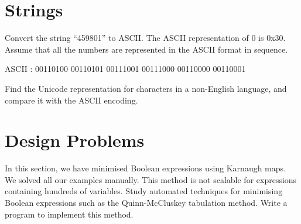 \begin{ExerciseList}
\end{ExerciseList}
\section*{Strings}

\begin{ExerciseList}
\Exercise
Convert the string ``459801'' to ASCII. The ASCII representation of 0 is 0x30.
Assume that all the numbers are represented in the ASCII format in sequence.

\Answer 
ASCII : 00110100 00110101 00111001 00111000 00110000 00110001

\Exercise
Find the Unicode representation for characters in a non-English language, and compare
it with the ASCII encoding.

\end{ExerciseList}

\section*{Design Problems}
\begin{ExerciseList}
\Exercise
In this section, we have minimised Boolean expressions using Karnaugh maps. We solved
all our examples manually. This method is not scalable for expressions containing
hundreds of variables. Study automated techniques for minimising Boolean expressions
such as the Quinn-McCluskey tabulation method. Write a program to implement this method.

\end{ExerciseList}
